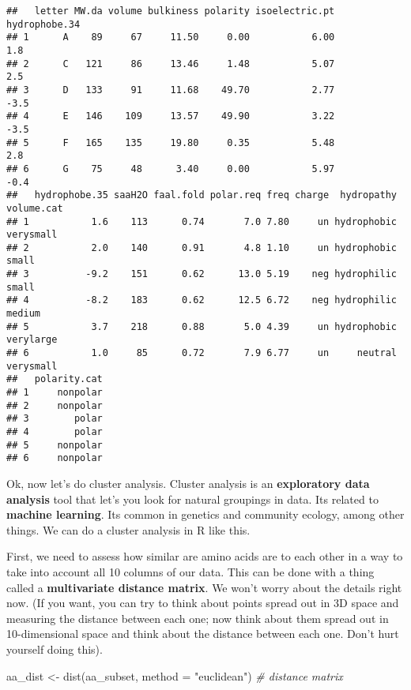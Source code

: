 \documentclass[
]{book}
\newenvironment{Shaded}{\begin{snugshade}}{\end{snugshade}}
\newcommand{\AttributeTok}[1]{\textcolor[rgb]{0.77,0.63,0.00}{#1}}
\newcommand{\CommentTok}[1]{\textcolor[rgb]{0.56,0.35,0.01}{\textit{#1}}}
\newcommand{\FunctionTok}[1]{\textcolor[rgb]{0.00,0.00,0.00}{#1}}
\newcommand{\NormalTok}[1]{#1}
\newcommand{\OtherTok}[1]{\textcolor[rgb]{0.56,0.35,0.01}{#1}}
\newcommand{\StringTok}[1]{\textcolor[rgb]{0.31,0.60,0.02}{#1}}
\begin{document}
\begin{verbatim}
##   letter MW.da volume bulkiness polarity isoelectric.pt hydrophobe.34
## 1      A    89     67     11.50     0.00           6.00           1.8
## 2      C   121     86     13.46     1.48           5.07           2.5
## 3      D   133     91     11.68    49.70           2.77          -3.5
## 4      E   146    109     13.57    49.90           3.22          -3.5
## 5      F   165    135     19.80     0.35           5.48           2.8
## 6      G    75     48      3.40     0.00           5.97          -0.4
##   hydrophobe.35 saaH2O faal.fold polar.req freq charge  hydropathy volume.cat
## 1           1.6    113      0.74       7.0 7.80     un hydrophobic  verysmall
## 2           2.0    140      0.91       4.8 1.10     un hydrophobic      small
## 3          -9.2    151      0.62      13.0 5.19    neg hydrophilic      small
## 4          -8.2    183      0.62      12.5 6.72    neg hydrophilic     medium
## 5           3.7    218      0.88       5.0 4.39     un hydrophobic  verylarge
## 6           1.0     85      0.72       7.9 6.77     un     neutral  verysmall
##   polarity.cat
## 1     nonpolar
## 2     nonpolar
## 3        polar
## 4        polar
## 5     nonpolar
## 6     nonpolar
\end{verbatim}

Ok, now let's do cluster analysis. Cluster analysis is an \textbf{exploratory data analysis} tool that let's you look for natural groupings in data. Its related to \textbf{machine learning}. Its common in genetics and community ecology, among other things. We can do a cluster analysis in R like this.

First, we need to assess how similar are amino acids are to each other in a way to take into account all 10 columns of our data. This can be done with a thing called a \textbf{multivariate distance matrix}. We won't worry about the details right now. (If you want, you can try to think about points spread out in 3D space and measuring the distance between each one; now think about them spread out in 10-dimensional space and think about the distance between each one. Don't hurt yourself doing this).

\begin{Shaded}
\begin{Highlighting}[]
\NormalTok{aa\_dist }\OtherTok{\textless{}{-}} \FunctionTok{dist}\NormalTok{(aa\_subset, }\AttributeTok{method =} \StringTok{"euclidean"}\NormalTok{) }\CommentTok{\# distance matrix}
\end{Highlighting}
\end{Shaded}
\end{document}
